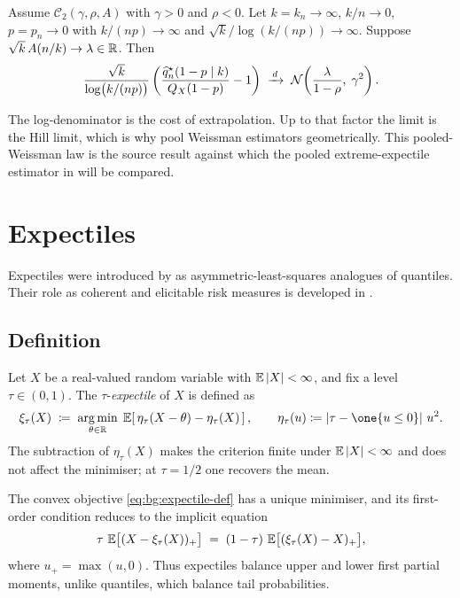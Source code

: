 \begin{theorem}
\label{thm:bg:weissman}
Assume $\mathcal C_{2}(\gamma, \rho, A)$ with $\gamma > 0$ and
$\rho < 0$. Let $k = k_{n} \to \infty$, $k / n \to 0$, $p = p_{n} \to 0$
with $k / (np) \to \infty$ and $\sqrt{k} / \log(k / (np)) \to \infty$.
Suppose $\sqrt{k}\, A(n/k) \to \lambda \in \mathbb{R}$. Then
\[
  \frac{\sqrt{k}}{\log\!\big(k/(np)\big)}
  \left( \frac{\widehat{q}^{\star}_{n}(1 - p \mid k)}{Q_{X}(1 - p)} - 1 \right)
  \;\xrightarrow{\,d\,}\;
  \mathcal N\!\left( \frac{\lambda}{1 - \rho},\; \gamma^{2} \right).
\]
\end{theorem}

The log-denominator is the cost of extrapolation. Up to that factor the
limit is the Hill limit, which is why
\textcite[\S2.3]{DaouiaPadoanStupfler2021} pool Weissman estimators
geometrically. This pooled-Weissman law is the source result against
which the pooled extreme-expectile estimator in
 will be compared.

\section{Expectiles}
\label{sec:bg:expectiles}

Expectiles were introduced by \textcite{NeweyPowell1987} as
asymmetric-least-squares analogues of quantiles. Their role as coherent
and elicitable risk measures is developed in
\textcite{BelliniKlarMullerRosazzaGianin2014,Ziegel2016,Gneiting2011,EhmGneitingJordanKrueger2016}.

\subsection{Definition}

Let $X$ be a real-valued random variable with $\operatorname{\mathbb{E}} |X| < \infty$, and
fix a level $\tau \in (0, 1)$. The $\tau$-\emph{expectile} of $X$ is
defined as
\begin{equation}
\label{eq:bg:expectile-def}
  \expectile{\tau}(X)
  \;\coloneqq\;
  \argmin_{\theta \in \R}\;
  \E\!\left[\, \eta_{\tau}(X - \theta) - \eta_{\tau}(X) \,\right],
  \qquad
  \eta_{\tau}(u) \coloneqq \abs{\tau - \one\{u \le 0\}}\, u^{2}.
\end{equation}
The subtraction of $\eta_\tau(X)$ makes the criterion finite under
$\operatorname{\mathbb{E}}|X|<\infty$ and does not affect the minimiser; at $\tau=1/2$ one
recovers the mean.

The convex objective \eqref{eq:bg:expectile-def} has a unique
minimiser, and its first-order condition reduces to the implicit
equation
\begin{equation}
\label{eq:bg:expectile-foc}
  \tau\, \operatorname{\mathbb{E}}\!\big[(X - \xi_{\tau}(X))_{+}\big]
  \;=\;
  (1 - \tau)\, \operatorname{\mathbb{E}}\!\big[(\xi_{\tau}(X) - X)_{+}\big],
\end{equation}
where $u_{+} = \max(u, 0)$. Thus expectiles balance upper and lower
first partial moments, unlike quantiles, which balance tail
probabilities.

